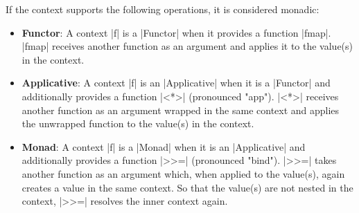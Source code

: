 If the context supports the following operations, it is considered monadic:

\begin{itemize}
  \item \textbf{Functor}: A context |f| is a |Functor| when it provides a function
|fmap|. |fmap| receives another function as an argument and applies it to the
value(s) in the context.\\
\item \textbf{Applicative}: A context |f| is an |Applicative| when it is a |Functor|
and additionally provides a function |<*>| (pronounced "app"). |<*>| receives
another function as an argument wrapped in the same context and applies the
unwrapped function to the value(s) in the context.\\
\item \textbf{Monad}: A context |f| is a |Monad| when it is an |Applicative| and
additionally provides a function |>>=| (pronounced "bind"). |>>=| takes another
function as an argument which, when applied to the value(s), again creates a
value in the same context. So that the value(s) are not nested in the context,
|>>=| resolves the inner context again.
\end{itemize}

